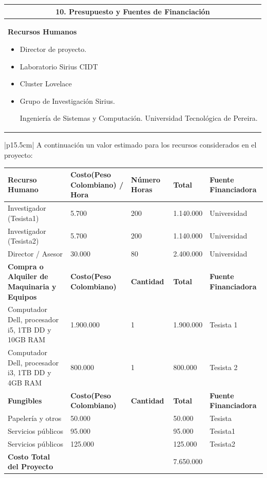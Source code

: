 \documentclass[letter,12pt]{article}
\begin{document}
\begin{center}
\begin{tabular}{|p{15.5cm}|}
\hline
\multicolumn{1}{|c|}{ \textbf{10. Presupuesto y Fuentes de Financiación}}\\
\hline

\textbf{Recursos Humanos}
\begin{itemize}
    \item Director de proyecto.
    \item Laboratorio Sirius CIDT
    \item Cluster Lovelace
    \item Grupo de Investigación Sirius. \par
    Ingeniería de Sistemas y Computación. Universidad Tecnológica de Pereira.
\end{itemize}\\
\hline
\end{tabular}
\end{center}
\begin{center}
\begin{tabular}{|p{15.5cm}|}
\hline
	A continuación un valor estimado para los recursos considerados en el proyecto:
	\begin{center}
    \begin{tabular}{|p{2.5cm}|p{3cm}|p{2cm}|p{2cm}|p{3cm}|}
    \hline
    \textbf{Recurso Humano} & \textbf{Costo(Peso Colombiano) / Hora } & \textbf{Número Horas} & \textbf{Total} & \textbf{Fuente Financiadora} \\
    \hline
    Investigador (Tesista1) & 5.700 & 200 & 1.140.000 & Universidad \\
    \hline
    Investigador (Tesista2) & 5.700 & 200 & 1.140.000 & Universidad \\
    \hline
    Director / Asesor & 30.000 & 80 & 2.400.000 & Universidad \\
    \hline
    \textbf{Compra o Alquiler de Maquinaria y Equipos} & \textbf{Costo(Peso Colombiano) } & \textbf{Cantidad} & \textbf{Total} & \textbf{Fuente Financiadora} \\
    \hline
    Computador Dell, procesador i5, 1TB DD y 10GB RAM & 1.900.000 & 1 & 1.900.000 & Tesista 1 \\
    \hline
Computador Dell, procesador i3, 1TB DD y 4GB RAM & 800.000 & 1 & 800.000 & Tesista 2\\
    \hline

    \textbf{Fungibles} & \textbf{Costo(Peso Colombiano) } & \textbf{Cantidad} & \textbf{Total} & \textbf{Fuente Financiadora} \\
    \hline
    Papelería y otros & 50.000 &  & 50.000 & Tesista \\
    \hline
    Servicios públicos & 95.000 &  & 95.000 & Tesista1 \\
    \hline
    Servicios públicos & 125.000 &  & 125.000 & Tesista2 \\
    \hline
    \textbf{Costo Total del Proyecto} &  &  & 7.650.000 &  \\
    \hline
    \end{tabular}
    \end{center}\\
\hline
\end{tabular}
\end{center}
\end{document}
